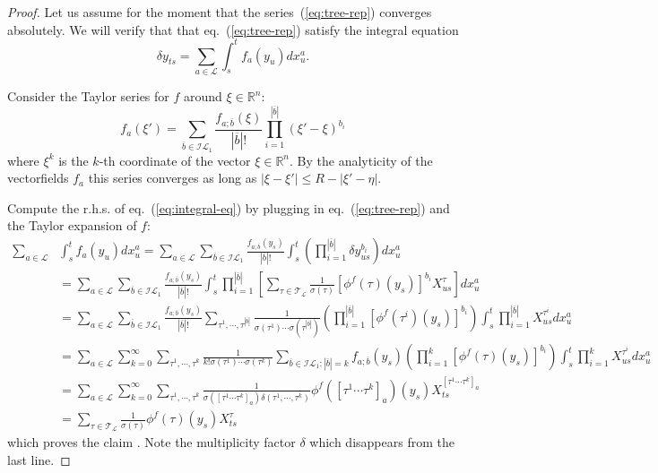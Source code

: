\documentclass[a4paper,11pt,reqno]{article}
\newcommand{\ol}[1]{\overline{#1}}
\newcommand{\1}{{\bf 1}}
\newcommand{\II}{\mathcal{I}}
\newcommand{\der}{\delta}
\newcommand{\RR}{\mathbb{R}}
\newcommand{\LL}{\mathcal{L}}
\newcommand{\TT}{\mathcal{T}}
\begin{document}
\begin{proof}
Let us assume for the moment that the series~(\ref{eq:tree-rep}) converges absolutely.
We will verify that that eq.~(\ref{eq:tree-rep})  satisfy the integral
equation
\begin{equation}
\label{eq:integral-eq}
\der y_{ts}  = \sum_{a\in\LL} \int_s^t f_a(y_u) dx^a_u .  
\end{equation}

Consider the Taylor series for $f$ around $\xi\in \RR^n$:
$$
f_a(\xi')  = \sum_{\ol b\in \II\LL_1 } \frac{f_{a; \ol b}(\xi)}{|\ol b|!} \prod_{i=1}^{|\ol b|}
(\xi'-\xi)^{b_i} 
$$
where $\xi^k$ is the $k$-th coordinate of the vector $\xi\in \RR^n$. By the analyticity of the vectorfields $f_a$ this series converges as long as $|\xi-\xi'| \le R-|\xi'-\eta|$.

Compute the r.h.s. of eq.~(\ref{eq:integral-eq}) by plugging in
eq.~(\ref{eq:tree-rep}) and the Taylor expansion of $f$:
\begin{equation*}
  \begin{split}
 \sum_{a\in\LL} & \int_s^t f_a(y_u) dx_u^a  = \sum_{a\in\LL} \sum_{\ol b \in \II \LL_1} 
\frac{f_{a;\ol b}(y_s)}{|\ol b|!} \int_s^t \left( \prod_{i=1}^{|\ol b|}
\der y^{b_i}_{us}\right) dx_u^a   
\\ & = \sum_{a\in\LL} \sum_{\ol b \in \II \LL_1} 
\frac{f_{a;\ol b}(y_s)}{|\ol b|!} \int_s^t \prod_{i=1}^{|\ol b|}
\left[
\sum_{\tau \in \TT_\LL}  \frac{1}{\sigma(\tau)} [\phi^{f}(\tau)(y_s)]^{b_i} X^{\tau}_{us}
 \right] dx_u^a    
\\ & = \sum_{a\in\LL} \sum_{\ol b \in \II\LL_1} \frac{f_{a;\ol b}(y_s)}{|\ol b|!}  \sum_{\tau^1,\cdots,\tau^{|\ol b|}}
 \frac{1}{\sigma(\tau^1)\cdots \sigma(\tau^{|\ol b|})}\left(\prod_{i=1}^{|\ol b|}[ \phi^{f}(\tau^i)(y_s)]^{b_i}\right)
 \int_s^t \prod_{i=1}^{|\ol b|}
  X^{\tau^i}_{us}
 dx_u^a    
\\ & = \sum_{a\in\LL} \sum_{k=0}^\infty  \sum_{\tau^1,\cdots,\tau^{k}} \frac{1}{k!\sigma(\tau^1)\cdots \sigma(\tau^k)}\sum_{\ol b \in \II\LL_1 : |\ol b| = k} f_{a;\ol b}(y_s)  
 \left(\prod_{i=1}^{k}[\phi^{f}(\tau)(y_s)]^{b_i}\right)
 \int_s^t \prod_{i=1}^{k}
  X^{\tau^i}_{us}
 dx_u^a    
\\ & =\sum_{a\in\LL} \sum_{k=0}^{\infty} 
\sum_{\tau^1,\cdots,\tau^{k}}
\frac{1}{\sigma([\tau^1\cdots\tau^{k}]_a) \delta(\tau^1,\cdots,\tau^{k})}
\phi^f([\tau^1\cdots\tau^{k}]_a)(y_s) X_{ts}^{[\tau^1\cdots\tau^{k}]_a}
\\ & = \sum_{\tau \in \TT_\LL} \frac{1}{\sigma(\tau)} \phi^{f}(\tau)(y_s) X^\tau_{ts}
  \end{split}
\end{equation*}
which proves the claim . Note the multiplicity factor $\delta$ which disappears from the last line.


\end{proof}
\end{document}
